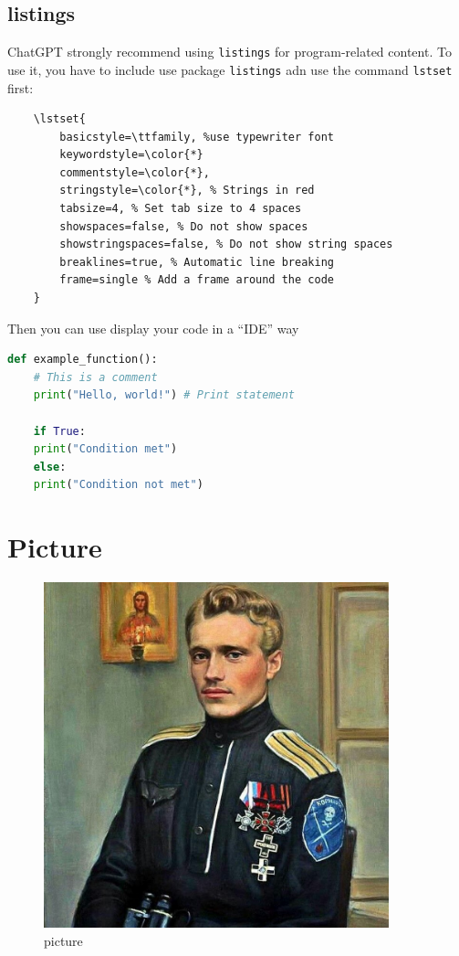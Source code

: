 \documentclass[12pt,a4paper]{article}
\begin{document}
\subsection{listings}
ChatGPT strongly recommend using \texttt{listings} for program-related content. To use it, you have to include use package \texttt{listings} adn use the command \texttt{lstset} first: 
\begin{verbatim}
	\lstset{
		basicstyle=\ttfamily, %use typewriter font
		keywordstyle=\color{*}
		commentstyle=\color{*}, 
		stringstyle=\color{*}, % Strings in red
		tabsize=4, % Set tab size to 4 spaces
		showspaces=false, % Do not show spaces
		showstringspaces=false, % Do not show string spaces
		breaklines=true, % Automatic line breaking
		frame=single % Add a frame around the code
	}	    
\end{verbatim}
Then you can use display your code in a ``IDE'' way
\begin{lstlisting}[language=Python]
	def example_function():
	# This is a comment
	print("Hello, world!") # Print statement
	
	if True:
	print("Condition met")
	else:
	print("Condition not met")
\end{lstlisting}

\section{Picture}
	\begin{figure}[H] %
	\centering
	\includegraphics[width=10cm]{./Pictures/example} %
	\caption{picture}		
\end{figure}
\end{document}
